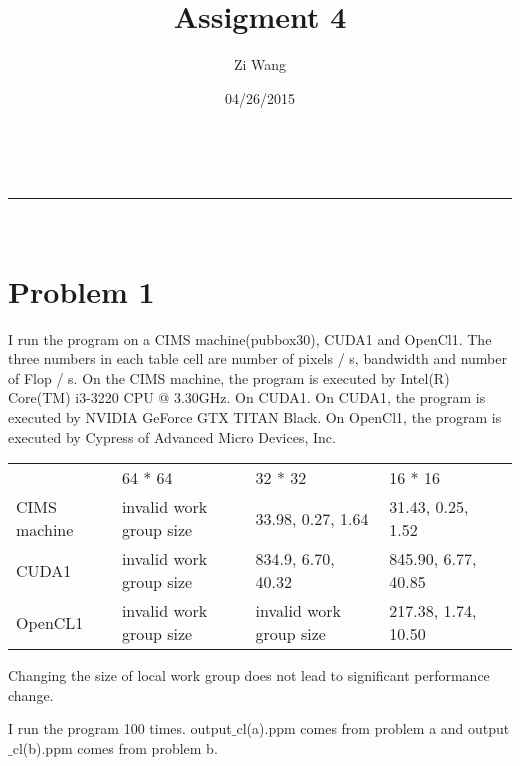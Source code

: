 \documentclass[a4paper,11pt]{article}
\makeatletter
\newcommand{\linia}{\rule{\linewidth}{0.5pt}}
\theoremstyle{mytheor}
\theoremstyle{mytheor}
\renewcommand{\maketitle}{
\begin{center}
\vspace{2ex}
{\huge \textsc{\@title}}
\vspace{1ex}
\\
\linia\\
\@author \hfill \@date
\vspace{4ex}
\end{center}
}
\makeatother
\begin{document}
\title{Assigment 4}

\author{Zi Wang}

\date{04/26/2015}

\maketitle

\section{Problem 1}
I run the program on a CIMS machine(pubbox30), CUDA1 and OpenCl1. The three numbers in each table cell are number of pixels / s, bandwidth and number of Flop / s. On the CIMS machine, the program is executed by Intel(R) Core(TM) i3-3220 CPU @ 3.30GHz. On CUDA1. On CUDA1, the program is executed by NVIDIA GeForce GTX TITAN Black. On OpenCl1, the program is executed by Cypress of Advanced Micro Devices, Inc. 

\begin{table}[h]
\begin{tabular}{lllll}
             & 64 * 64                 & 32 * 32                 & 16 * 16             &  \\
CIMS machine & invalid work group size & 33.98, 0.27, 1.64       & 31.43, 0.25, 1.52   &  \\
CUDA1        & invalid work group size & 834.9, 6.70, 40.32      & 845.90, 6.77, 40.85 &  \\
OpenCL1      & invalid work group size & invalid work group size & 217.38, 1.74, 10.50 & 
\end{tabular}
\end{table}


Changing the size of local work group does not lead to significant performance change.

I run the program 100 times. output$\_$cl(a).ppm comes from problem a and output$\_$cl(b).ppm comes from problem b.
\end{document}

